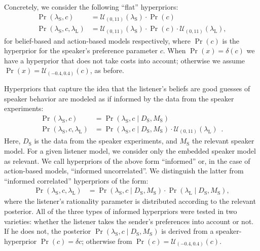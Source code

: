 Concretely, we consider the following ``flat'' hyperpriors:
\begin{align*}
  \Pr(\lambda_\mathrm{S},c) & =
  \mathcal{U}_{(0,11)}(\lambda_\mathrm{S}) \cdot
  \Pr(c) \\
  \Pr(\lambda_\mathrm{S},c,\lambda_\mathrm{L}) & = 
  \mathcal{U}_{(0,11)}(\lambda_\mathrm{S}) \cdot
    \Pr(c) \cdot  \mathcal{U}_{(0,11)}(
    \lambda_\mathrm{L}),
\end{align*}
for belief-based and action-based models respectively, where $\Pr(c)$
is the hyperprior for the speaker's preference parameter $c$. When
$\Pr(x) = \delta(c)$ we have a hyperprior that does not take costs
into account; otherwise we assume $\Pr(x) =
\mathcal{U}_{(-0.4,0.4)}(c)$, as before.

Hyperpriors that capture the idea that the listener's beliefs are good
guesses of speaker behavior are modeled as if informed by the data
from the speaker experiments:
\begin{align*}
  \Pr(\lambda_\mathrm{S},c) & = \Pr(\lambda_\mathrm{S},c \mid D_\mathrm{S}, M_\mathrm{S}) \\
  \Pr(\lambda_\mathrm{S},c,\lambda_\mathrm{L}) & = 
   \Pr(\lambda_\mathrm{S},c \mid D_\mathrm{S}, M_\mathrm{S}) \cdot  \mathcal{U}_{(0,11)}(
    \lambda_\mathrm{L}) \enspace .
\end{align*}
Here, $D_\mathrm{S}$ is the data from the speaker experiments, and
$M_\mathrm{S}$ the relevant speaker model. For a given listener model,
we consider only the embedded speaker model as relevant. We call
hyperpriors of the above form ``informed'' or, in the case of
action-based models, ``informed uncorrelated''. We distinguish the
latter from ``informed correlated'' hyperpriors of the form:
\begin{align*}
  \Pr(\lambda_\mathrm{S},c,\lambda_\mathrm{L}) & = 
   \Pr(\lambda_\mathrm{S},c \mid D_\mathrm{S}, M_\mathrm{S}) \cdot \Pr(\lambda_\mathrm{L} \mid D_\mathrm{S}, M_\mathrm{S}),
\end{align*}
where the listener's rationality parameter is distributed according to
the relevant posterior. All of the three types of informed hyperpriors
were tested in two varieties: whether the listener takes the sender's
preferences into account or not. If he does not, the posterior
$\Pr(\lambda_\mathrm{S},c \mid D_\mathrm{S}, M_\mathrm{S})$ is derived
from a speaker-hyperprior $\Pr(c) = \delta{c}$; otherwise from $\Pr(c)
= \mathcal{U}_{(-0.4,0.4)}(c)$.

